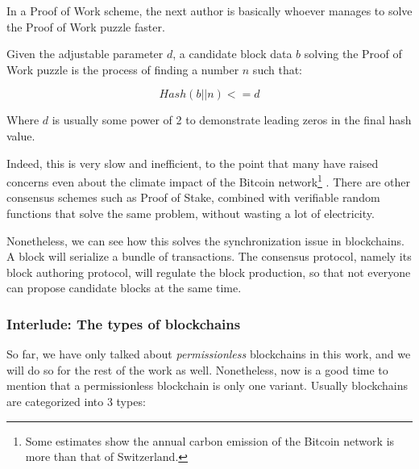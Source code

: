 In a Proof of Work scheme, the next author is basically whoever manages to solve the Proof of Work
puzzle faster.

\begin{definition} \label{def:pow}
	Given the adjustable parameter $d$, a candidate block data $b$ solving the Proof of Work puzzle
	is the process of finding a number $n$ such that:

	\begin{equation}
		Hash(b || n) <= d
	\end{equation}

Where $d$ is usually some power of 2 to demonstrate leading zeros in the final hash value.
\end{definition}


Indeed, this is very slow and inefficient, to the point that many have raised concerns even about
the climate impact of the Bitcoin network\footnote{Some estimates show the annual carbon emission of
the Bitcoin network is more than that of Switzerland.} \cite{btc_carbon}. There are other consensus
schemes such as Proof of Stake, combined with verifiable random functions that solve the same
problem, without wasting a lot of electricity.

Nonetheless, we can see how this solves the synchronization issue in blockchains. A block will
serialize a bundle of transactions. The consensus protocol, namely its block authoring protocol,
will regulate the block production, so that not everyone can propose candidate blocks at the same
time.

\subsubsection{Interlude: The types of blockchains}

So far, we have only talked about \textit{permissionless} blockchains in this work, and we will do
so for the rest of the work as well. Nonetheless, now is a good time to mention that a
permissionless blockchain is only one variant. Usually blockchains are categorized into 3 types:

